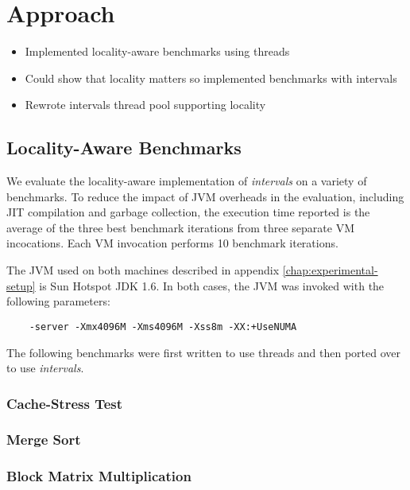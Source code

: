 
\chapter{Approach}
\label{chap:locality-approach}


\begin{itemize}
\item Implemented locality-aware benchmarks using threads
\item Could show that locality matters so implemented benchmarks with
  intervals
\item Rewrote intervals thread pool supporting locality
\end{itemize}

\section{Locality-Aware Benchmarks}

We evaluate the locality-aware implementation of \emph{intervals} on a
variety of benchmarks. To reduce the impact of JVM overheads in the
evaluation, including JIT compilation and garbage collection, the
execution time reported is the average of the three best benchmark
iterations from three separate VM incocations. Each VM invocation
performs 10 benchmark iterations.

The JVM used on both machines described in appendix
\ref{chap:experimental-setup} is Sun Hotspot JDK 1.6. In both cases,
the JVM was invoked with the following parameters:

\begin{verbatim}
    -server -Xmx4096M -Xms4096M -Xss8m -XX:+UseNUMA
\end{verbatim}

The following benchmarks were first written to use threads and then
ported over to use \emph{intervals}.

\subsection*{Cache-Stress Test}


\subsection*{Merge Sort}


\subsection*{Block Matrix Multiplication}



